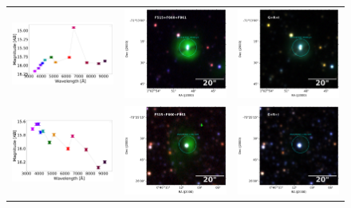 \documentclass[11pt]{article}
\begin{document}
\begin{figure}[!h]
\begin{tabular}{ccc}
\includegraphics[width=0.3\linewidth, clip]{photopectrum_splus_MC0095-265990_compat-HIIRegions-smc-match-splus_aper.pdf} & \includegraphics[width=0.3\linewidth, clip]{MC0095/MC0095_F861_265990-RGB-hii.pdf} & \includegraphics[width=0.3\linewidth, clip]{MC0095/MC0095_I_265990-RGB-hii.pdf} \\
\includegraphics[width=0.3\linewidth, clip]{photopectrum_splus_MC0114-222322_compat-HIIRegions-smc-match-splus_aper.pdf} & \includegraphics[width=0.3\linewidth, clip]{MC0114/MC0114_F861_222322-RGB-hii.pdf} & \includegraphics[width=0.3\linewidth, clip]{MC0114/MC0114_I_222322-RGB-hii.pdf} \\

\end{tabular}
\end{figure}
\end{document}
